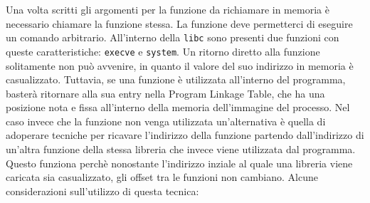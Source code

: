 Una volta scritti gli argomenti per la funzione da richiamare in
memoria è necessario chiamare la funzione stessa. La funzione deve
permetterci di eseguire un comando arbitrario. All'interno della
\lstinline{libc} sono presenti due funzioni con queste
caratteristiche: \lstinline{execve} e \lstinline{system}. Un ritorno
diretto alla funzione solitamente non può avvenire, in quanto il
valore del suo indirizzo in memoria è casualizzato. Tuttavia, se una
funzione è utilizzata all'interno del programma, basterà ritornare
alla sua entry nella Program Linkage Table, che ha una posizione nota
e fissa all'interno della memoria dell'immagine del processo. Nel caso
invece che la funzione non venga utilizzata un'alternativa è quella di
adoperare tecniche per ricavare l'indirizzo della funzione partendo
dall'indirizzo di un'altra funzione della stessa libreria che invece
viene utilizzata dal programma. Questo funziona perchè nonostante
l'indirizzo inziale al quale una libreria viene caricata sia
casualizzato, gli offset tra le funzioni non cambiano. Alcune
considerazioni sull'utilizzo di questa tecnica:

